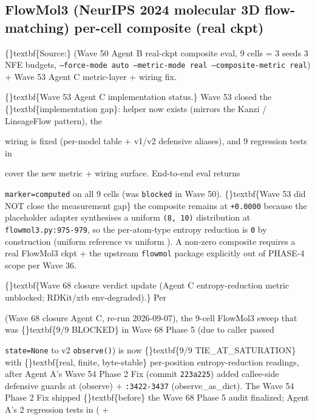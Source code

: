 \documentclass{article}
\begin{document}
\subsection{FlowMol3 (NeurIPS 2024 molecular 3D flow-matching)  per-cell composite (real ckpt)}
\{\}textbf\{Source:\}  (Wave 50 Agent B real-ckpt composite eval, 9 cells = 3 seeds  3 NFE budgets, \texttt{--force-mode auto --metric-mode real --composite-metric real}) + Wave 53 Agent C metric-layer + wiring fix.

\{\}textbf\{Wave 53 Agent C implementation status.\} Wave 53 closed the \{\}textbf\{implementation gap\}:  helper now exists (mirrors the Kanzi / LineageFlow pattern), the

 wiring is fixed (per-model  table + v1/v2 defensive aliases), and 9 regression tests in

 cover the new metric + wiring surface. End-to-end eval returns

\texttt{marker=computed} on all 9 cells (was \texttt{blocked} in Wave 50). \{\}textbf\{Wave 53 did NOT close the measurement gap\}  the composite remains at \texttt{+0.0000} because the placeholder adapter synthesises a uniform \texttt{(8, 10)} distribution at \texttt{flowmol3.py:975-979}, so the per-atom-type entropy reduction is \texttt{0} by construction (uniform reference vs uniform ). A non-zero composite requires a real FlowMol3 ckpt + the upstream \texttt{flowmol} package  explicitly out of PHASE-4 scope per Wave 36.

\{\}textbf\{Wave 68 closure verdict update (Agent C  entropy-reduction metric unblocked; RDKit/xtb env-degraded).\} Per

 (Wave 68 closure Agent C, re-run 2026-09-07), the 9-cell FlowMol3 sweep that was \{\}textbf\{9/9 BLOCKED\} in Wave 68 Phase 5 (due to   caller passed

\texttt{state=None} to v2 \texttt{observe()}) is now \{\}textbf\{9/9 TIE\_AT\_SATURATION\} with \{\}textbf\{real, finite, byte-stable\} per-position entropy-reduction readings, after Agent A's Wave 54 Phase 2 Fix (commit \texttt{223a225}) added callee-side defensive guards at  (observe) + \texttt{:3422-3437} (observe\_as\_dict). The Wave 54 Phase 2 Fix shipped \{\}textbf\{before\} the Wave 68 Phase 5 audit finalized; Agent A's 2 regression tests in  ( +
\end{document}
